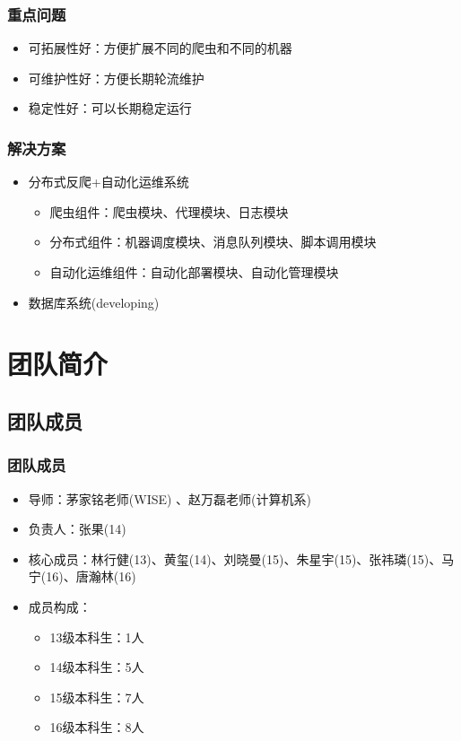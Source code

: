 \documentclass{beamer}
\begin{document}
\begin{frame}
\frametitle{重点问题}
\begin{itemize}
  \item 可拓展性好：方便扩展不同的爬虫和不同的机器
  \item 可维护性好：方便长期轮流维护
  \item 稳定性好：可以长期稳定运行
\end{itemize}
\end{frame}

\begin{frame}
\frametitle{解决方案}
\begin{itemize}
  \item 分布式反爬+自动化运维系统
  \begin{itemize}
    \item 爬虫组件：爬虫模块、代理模块、日志模块
    \item 分布式组件：机器调度模块、消息队列模块、脚本调用模块
    \item 自动化运维组件：自动化部署模块、自动化管理模块
  \end{itemize}
  \item 数据库系统(developing)
\end{itemize}
\end{frame}

\section{团队简介}
\subsection{团队成员}
\begin{frame}[allowframebreaks]
\frametitle{团队成员}
\begin{itemize}
  \item 导师：茅家铭老师(WISE)\footnotemark
  、赵万磊老师(计算机系)\footnotemark  
  \item 负责人：张果(14)\footnotemark
  \item 核心成员：林行健(13)、黄玺(14)、刘晓曼(15)、朱星宇(15)、张祎璘(15)、马宁(16)、唐瀚林(16)
  \item 成员构成：
  \begin{itemize}
    \item 13级本科生：1人
    \item 14级本科生：5人
    \item 15级本科生：7人
    \item 16级本科生：8人
  \end{itemize}
  \end{itemize}
  \end{frame}
  
\end{document}

